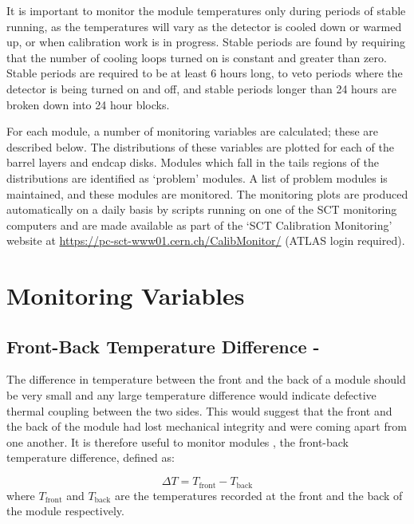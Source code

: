 It is important to monitor the module temperatures only during periods of stable running, as
the temperatures will vary as the detector is cooled down or warmed up, or when
calibration work is in progress. Stable periods are
found by requiring that the number of cooling loops turned on is constant and
greater than zero. Stable periods are required to be at least 6 hours long, to
veto periods where the detector is being turned on and off, and stable periods
longer than 24 hours are broken down into 24 hour blocks.

For each module, a number of monitoring variables are calculated; these are
described below. The distributions of these variables are plotted for each of
the barrel layers and endcap disks. Modules which fall in the tails 
regions of the distributions are identified as `problem' modules. A list of
problem modules is maintained, and these modules are monitored. The monitoring plots are
produced automatically on a daily basis by scripts running on one of the SCT
monitoring computers and are made available as part of the `SCT
Calibration Monitoring' website at
\url{https://pc-sct-www01.cern.ch/CalibMonitor/} (ATLAS login required).

\section{Monitoring Variables}

\subsection{Front-Back Temperature Difference - \deltat }

The difference in temperature between the front and the back of a module
should be very small and any large temperature difference would indicate
defective thermal coupling between the two sides. This would suggest that the
front and the back of the module had lost mechanical integrity and were coming
apart from one another. It is therefore useful to monitor modules \deltat, the
front-back temperature difference, defined as:

\begin{equation}
 \Delta T = T_{\mathrm{front}} - T_{\mathrm{back}}
\end{equation}
where $T_{\mathrm{front}}$ and $T_{\mathrm{back}}$ are the temperatures recorded at the front and the back of the module respectively. 


